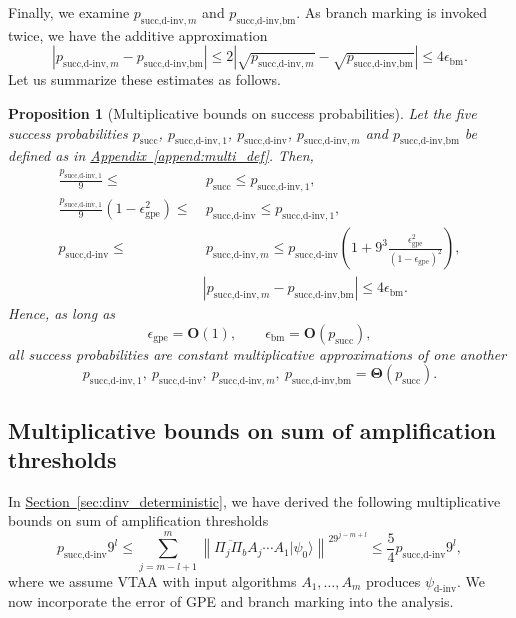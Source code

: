 \documentclass[letterpaper,onecolumn,11pt,accepted=2026-02-14]{quantumarticle}
\newcommand{\abs}[1]{\left\lvert#1\right\rvert}
\newcommand{\norm}[1]{\left\lVert#1\right\rVert}
\newtheorem{proposition}[lemma]{Proposition}
\theoremstyle{remark}
\theoremstyle{plain}
\renewcommand{\sec}[1]{\hyperref[sec:#1]{Section~\ref*{sec:#1}}}
\newcommand{\append}[1]{\hyperref[append:#1]{Appendix~\ref*{append:#1}}}
\newcommand{\ket}[1]{|#1\rangle}
\begin{document}
Finally, we examine $p_{\text{succ,d-inv},m}$ and $p_{\text{succ,d-inv,bm}}$. As branch marking is invoked twice, we have the additive approximation
\begin{equation}
    \abs{p_{\text{succ,d-inv},m}-p_{\text{succ,d-inv,bm}}}
    \leq2\abs{\sqrt{p_{\text{succ,d-inv},m}}-\sqrt{p_{\text{succ,d-inv,bm}}}}
    \leq4\epsilon_{\text{bm}}.
\end{equation}
Let us summarize these estimates as follows.
\begin{proposition}[Multiplicative bounds on success probabilities]
\label{prop:multi_succ}
Let the five success probabilities $p_{\text{succ}}$, $p_{\text{succ,d-inv},1}$, $p_{\text{succ,d-inv}}$, $p_{\text{succ,d-inv},m}$ and $p_{\text{succ,d-inv,bm}}$ be defined as in \append{multi_def}. Then,
\begin{equation}
\begin{aligned}
    \frac{p_{\text{succ,d-inv},1}}{9}\leq &\ p_{\text{succ}}\leq p_{\text{succ,d-inv},1},\\
    \frac{p_{\text{succ,d-inv},1}}{9}\left(1-\epsilon_{\text{gpe}}^2\right)
    \leq &\ p_{\text{succ,d-inv}}
    \leq p_{\text{succ,d-inv},1},\\
    p_{\text{succ,d-inv}}
    \leq &\ p_{\text{succ,d-inv},m}
    \leq p_{\text{succ,d-inv}}\left(1+9^3\frac{\epsilon_{\text{gpe}}^2}{\left(1-\epsilon_{\text{gpe}}\right)^2}\right),\\
    &\abs{p_{\text{succ,d-inv},m}-p_{\text{succ,d-inv,bm}}}
    \leq4\epsilon_{\text{bm}}.
\end{aligned}
\end{equation}
Hence, as long as
\begin{equation}
    \epsilon_{\text{gpe}}=\mathbf{O}(1),\qquad
    \epsilon_{\text{bm}}=\mathbf{O}\left(p_{\text{succ}}\right),
\end{equation}
all success probabilities are constant multiplicative approximations of one another
\begin{equation}
    p_{\text{succ,d-inv},1},\
    p_{\text{succ,d-inv}},\
    p_{\text{succ,d-inv},m},\
    p_{\text{succ,d-inv,bm}}
    =\mathbf{\Theta}\left(p_{\text{succ}}\right).
\end{equation}
\end{proposition}

\subsection{Multiplicative bounds on sum of amplification thresholds}
\label{append:multi_threshold}
In \sec{dinv_deterministic}, we have derived the following multiplicative bounds on sum of amplification thresholds
\begin{equation}
    p_{\text{succ,d-inv}}9^l
    \leq\sum_{j=m-l+1}^{m}\norm{\overline{\Pi_{j}\Pi_b}A_{j}\cdots A_1\ket{\psi_0}}^29^{j-m+l}
    \leq\frac{5}{4}p_{\text{succ,d-inv}}9^l,
\end{equation}
where we assume VTAA with input algorithms $A_1,\ldots,A_m$ produces $\psi_{\text{d-inv}}$. We now incorporate the error of GPE and branch marking into the analysis.
\end{document}
